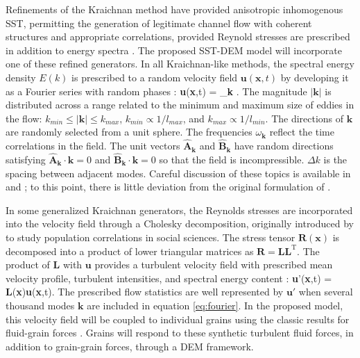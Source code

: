 Refinements of the Kraichnan method have provided anisotropic inhomogenous SST, permitting the generation of legitimate channel flow with coherent structures and appropriate correlations, provided Reynold stresses are prescribed in addition to energy spectra \citep{Clark2011,Dhamankar2015,Smirnov2001,Yu2014, Shur2014, Adler2018}. The proposed SST-DEM model will incorporate one of these refined generators. In all Kraichnan-like methods, the spectral energy density $E(k)$ is prescribed to a random velocity field $\textbf{u}(\textbf{x},t)$ by developing it as a Fourier series with random phases \citep{Bechara1994,Bailly1999}: \be \textbf{u}(\textbf{x},t) = \sum_\textbf{k} .\label{eq:fourier}\ee
The magnitude $|\textbf{k}|$ is distributed across a range related to the minimum and maximum size of eddies in the flow: $k_{min}\leq|\textbf{k}|\leq k_{max}$, $k_{min} \propto 1/l_{max}$, and $k_{max} \propto 1/l_{min}$. The directions of $\textbf{k}$ are randomly selected from a unit sphere. The frequencies $\omega_\textbf{k}$ reflect the time correlations in the field. The unit vectors $\hat{\textbf{A}}_\textbf{k}$ and $\hat{\textbf{B}}_\textbf{k}$ have random directions satisfying $\hat{\textbf{A}}_\textbf{k}\cdot \textbf{k} = 0$ and $\hat{\textbf{B}}_\textbf{k}\cdot \textbf{k} = 0$ so that the field is incompressible. $\Delta k$ is the spacing between adjacent modes. Careful discussion of these topics is available in \cite{Dhamankar2015} and \cite{Wu2017}; to this point, there is little deviation from the original formulation of \cite{Kraichnan1970}.  
\bigskip 

In some generalized Kraichnan generators, the Reynolds stresses are incorporated into the velocity field through a Cholesky decomposition, originally introduced by \cite{Kaiser1962} to study population correlations in social sciences. The stress tensor $\textbf{R}(\textbf{x})$ is decomposed into a product of lower triangular matrices as $\textbf{R} = \textbf{L}\textbf{L}^\text{T}$. The product of $\textbf{L}$ with $\textbf{u}$ provides a turbulent velocity field with prescribed mean velocity profile, turbulent intensities, and spectral energy content \citep{Shur2014,Dhamankar2015,Wu2017}:
\be \textbf{u}'(\textbf{x},t) = \textbf{L}(\textbf{x})\textbf{u}(\textbf{x},t).\ee
The prescribed flow statistics are well represented by $\textbf{u}'$ when several thousand modes $\textbf{k}$ are included in equation \ref{eq:fourier}. In the proposed model, this velocity field will be coupled to individual grains using the classic results for fluid-grain forces \citep[e.g.][]{Maxey1983}. Grains will respond to these synthetic turbulent fluid forces, in addition to grain-grain forces, through a DEM framework. 
\bigskip 

